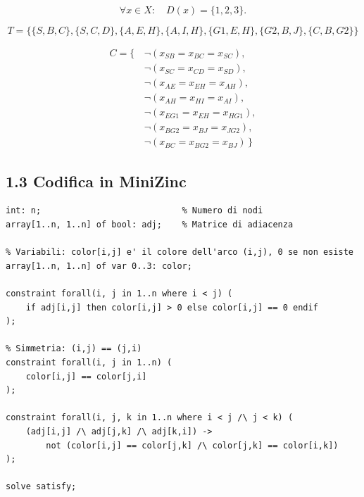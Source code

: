 \documentclass[a4paper,11pt]{article}
\begin{document}
\[
\forall x \in X:\quad D(x)=\{1,2,3\}.
\]

\[
T = \{
  \{ S, B, C \},
  \{ S, C, D \},
  \{ A, E, H \},
  \{ A, I, H \},
  \{ G1, E, H \},
  \{ G2, B, J \},
  \{ C, B, G2 \}
  \}
\]

\[
\begin{aligned}
C = \{\,&\neg(x_{SB} = x_{BC} = x_{SC}),\\
      &\neg(x_{SC} = x_{CD} = x_{SD}),\\
      &\neg(x_{AE} = x_{EH} = x_{AH}),\\
      &\neg(x_{AH} = x_{HI} = x_{AI}),\\
      &\neg(x_{EG1} = x_{EH} = x_{HG1}),\\
      &\neg(x_{BG2} = x_{BJ} = x_{JG2}),\\
      &\neg(x_{BC} = x_{BG2} = x_{BJ})\,\}
\end{aligned}
\]

\newpage

\subsection*{1.3 Codifica in MiniZinc}
\begin{lstlisting}
int: n;                            % Numero di nodi
array[1..n, 1..n] of bool: adj;    % Matrice di adiacenza

% Variabili: color[i,j] e' il colore dell'arco (i,j), 0 se non esiste
array[1..n, 1..n] of var 0..3: color;

constraint forall(i, j in 1..n where i < j) (
    if adj[i,j] then color[i,j] > 0 else color[i,j] == 0 endif
);

% Simmetria: (i,j) == (j,i)
constraint forall(i, j in 1..n) (
    color[i,j] == color[j,i]
);

constraint forall(i, j, k in 1..n where i < j /\ j < k) (
    (adj[i,j] /\ adj[j,k] /\ adj[k,i]) -> 
        not (color[i,j] == color[j,k] /\ color[j,k] == color[i,k])
);

solve satisfy;
\end{lstlisting}
\end{document}

